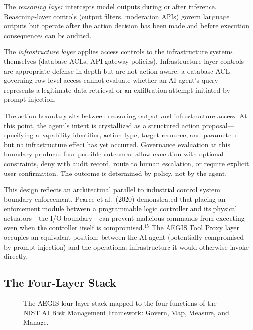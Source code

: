 \documentclass{IEEEcsmag}
\begin{document}
The {\it reasoning layer} intercepts model outputs during or after inference. Reasoning-layer controls (output filters, moderation APIs) govern language outputs but operate after the action decision has been made and before execution consequences can be audited.

The {\it infrastructure layer} applies access controls to the infrastructure systems themselves (database ACLs, API gateway policies). Infrastructure-layer controls are appropriate defense-in-depth but are not action-aware: a database ACL governing row-level access cannot evaluate whether an AI agent's query represents a legitimate data retrieval or an exfiltration attempt initiated by prompt injection.

The action boundary sits between reasoning output and infrastructure access. At this point, the agent's intent is crystallized as a structured action proposal---specifying a capability identifier, action type, target resource, and parameters---but no infrastructure effect has yet occurred. Governance evaluation at this boundary produces four possible outcomes: allow execution with optional constraints, deny with audit record, route to human escalation, or require explicit user confirmation. The outcome is determined by policy, not by the agent.

This design reflects an architectural parallel to industrial control system boundary enforcement. Pearce et al.\ (2020) demonstrated that placing an enforcement module between a programmable logic controller and its physical actuators---the I/O boundary---can prevent malicious commands from executing even when the controller itself is compromised.$^{15}$ The AEGIS Tool Proxy layer occupies an equivalent position: between the AI agent (potentially compromised by prompt injection) and the operational infrastructure it would otherwise invoke directly.

\subsection{The Four-Layer Stack}

\begin{figure}[!t]
\centering
{}
\caption{The AEGIS four-layer stack mapped to the four functions of the NIST AI Risk Management Framework: Govern, Map, Measure, and Manage.}
\label{fig:fourlayer}
\end{figure}
\end{document}
